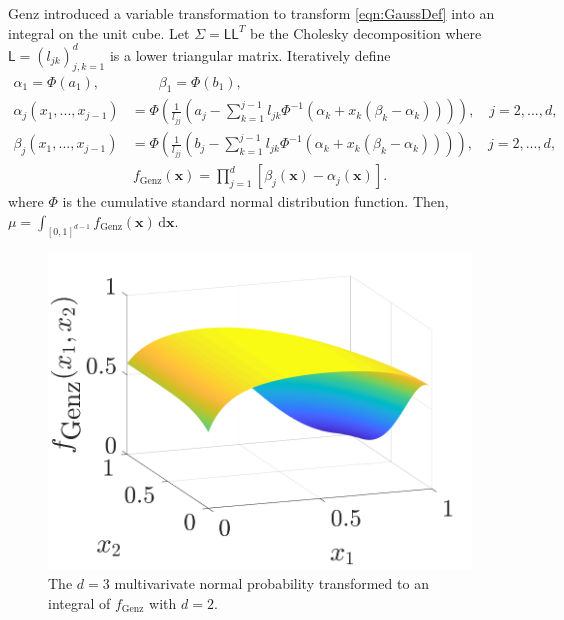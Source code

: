 \documentclass{iitthesis}          %
\newcommand{\bm}[1]{\boldsymbol{#1}}
\newcommand{\mSigma}{\mathsf{\Sigma}}
\newcommand{\dif}[1]{\text{d}{#1}}
\newcommand{\vx}{\bm{x}}
\newcommand{\dvx}{\dif{\bm{x}}}
\newcommand{\mL}{\mathsf{L}}
\begin{document}
Genz \cite{Gen93} introduced a variable transformation to transform \eqref{eqn:GaussDef} into an integral on the unit cube.  Let $\mSigma= \mL \mL^T$ be the Cholesky decomposition where $\mL = (l_{jk})_{j,k=1}^d$ is a lower triangular matrix.  Iteratively define
\begin{align*}
\alpha_1 = \Phi(a_1), 
&\qquad
\beta_1 = \Phi(b_1),
\\
\alpha_j(x_1,...,x_{j-1}) &= 
\Phi
\left(
\frac{1}{l_{jj}} 
\left(
a_j - \sum_{k=1}^{j-1} l_{jk} \Phi^{-1}(\alpha_k + x_k(\beta_k-\alpha_k))
\right)
\right), \quad j=2,...,d,
\\
\beta_j(x_1,...,x_{j-1}) &= 
\Phi
\left(
\frac{1}{l_{jj}} 
\left(
b_j - \sum_{k=1}^{j-1} l_{jk} \Phi^{-1}(\alpha_k + x_k(\beta_k-\alpha_k))
\right)
\right), \quad j=2,...,d,
\end{align*}
\begin{align}
\label{fGenzdef}
f_{\text{Genz}}(\vx) = \prod_{j=1}^d [\beta_j(\vx) - \alpha_j(\vx)].
\end{align}
where $\Phi$ is the cumulative standard normal distribution function.  Then, $\mu = \int_{[0,1]^{d-1}} f_{\text{Genz}}(\vx) \, \dvx$.

\begin{figure}
	\centering
		\includegraphics[width=1.1\linewidth]{GenzFunc_varTx_none}
	\caption{The $d=3$ multivarivate normal probability transformed to an integral of $f_{\text{Genz}}$ with  $d=2$.}
	\label{fig:MVN_Genz}
\end{figure}
\end{document}
